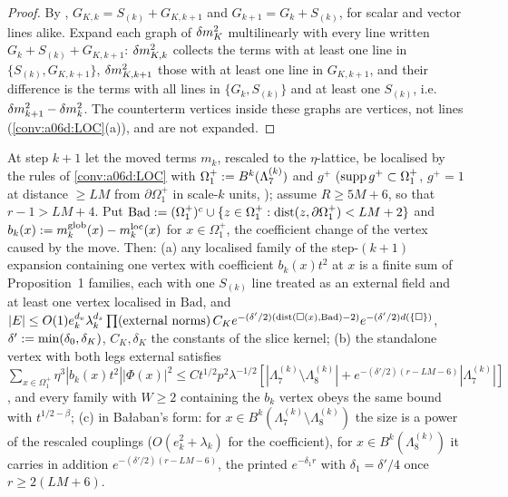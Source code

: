 \begin{proof}
By \cite[(1.27)]{Ba3}, $G_{K,k}=S_{(k)}+G_{K,k+1}$ and $G_{k+1}=G_k+S_{(k)}$, for scalar and vector lines alike. Expand each graph of $\delta m^2_K$ multilinearly with every line written $G_k+S_{(k)}+G_{K,k+1}$: $\delta m^2_{K,k}$ collects the terms with at least one line in $\{S_{(k)},G_{K,k+1}\}$, $\delta m^2_{K,k+1}$ those with at least one line in $G_{K,k+1}$, and their difference is the terms with all lines in $\{G_k,S_{(k)}\}$ and at least one $S_{(k)}$, i.e.\ $\delta m^2_{k+1}-\delta m^2_k$. The counterterm vertices inside these graphs are vertices, not lines (\cref{conv:a06d:LOC}(a)), and are not expanded.
\end{proof}

\begin{lemma}\label{lem:a06d:D22}
At step $k+1$ let the moved terms $m_k$, rescaled to the $\eta$-lattice, be localised by the rules of \cref{conv:a06d:LOC} with $\Omega^+_1:= B^k(\Lambda^{(k)}_7)$ and $g^+$ ($\operatorname{supp} g^+\subset\Omega^+_1$, $g^+=1$ at distance $\ge LM$ from $\partial\Omega^+_1$ in scale-$k$ units, \cite[p.~412]{Ba3}); assume $R\ge5M+6$, so that $r-1>LM+4$. Put $\mathrm{Bad}:=(\Omega^+_1)^c\cup\{z\in\Omega^+_1:\operatorname{dist}(z,\partial\Omega^+_1)<LM+2\}$ and $b_k(x):= m^{\mathrm{glob}}_k(x)-m^{\mathrm{loc}}_k(x)$ for $x\in\Omega^+_1$, the coefficient change of the \cite[(1.7)]{Ba3} vertex caused by the move. Then: \textup{(a)} any localised family of the step-$(k+1)$ expansion containing one \cite[(1.7)]{Ba3} vertex with coefficient $b_k(x)t^2$ at $x$ is a finite sum of Proposition~1 families, each with one $S_{(k)}$ line treated as an external field and at least one vertex localised in $\mathrm{Bad}$, and $|E|\le O(1)e_k^{d_v}\lambda_k^{d_s}\prod(\text{external norms})\,C_Ke^{-(\delta'/2)(\operatorname{dist}(\square(x),\mathrm{Bad})-2)}e^{-(\delta'/2)d(\{\square\})}$, $\delta':=\min(\delta_0,\delta_K)$, $C_K,\delta_K$ the constants of the slice kernel; \textup{(b)} the standalone vertex with both legs external satisfies $\sum_{x\in\Omega^+_1}\eta^3|b_k(x)t^2||\Phi(x)|^2\le Ct^{1/2}p^2\lambda^{-1/2}[|\Lambda^{(k)}_7\setminus\Lambda^{(k)}_8|+e^{-(\delta'/2)(r-LM-6)}|\Lambda^{(k)}_7|]$, and every family with $W\ge2$ containing the $b_k$ vertex obeys the same bound with $t^{1/2-\beta}$; \textup{(c)} in Ba{\l}aban's form: for $x\in B^k(\Lambda^{(k)}_7\setminus\Lambda^{(k)}_8)$ the size is a power of the rescaled couplings ($O(e_k^2+\lambda_k)$ for the coefficient), for $x\in B^k(\Lambda^{(k)}_8)$ it carries in addition $e^{-(\delta'/2)(r-LM-6)}$, the printed $e^{-\delta_1r}$ with $\delta_1=\delta'/4$ once $r\ge2(LM+6)$.
\end{lemma}

